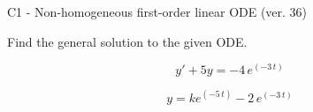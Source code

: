 \begin{exercise}
  \begin{exerciseTitle}C1 - Non-homogeneous first-order linear ODE (ver. 36)\end{exerciseTitle}
  \begin{exerciseStatement}
    
Find the general solution to the given ODE.

    
\[y'+5y= -4 \, e^{\left(-3 \, t\right)}\]

  \end{exerciseStatement}
  \begin{exerciseAnswer}
    
\[y= k e^{\left(-5 \, t\right)} - 2 \, e^{\left(-3 \, t\right)}\]

  \end{exerciseAnswer}
\end{exercise}